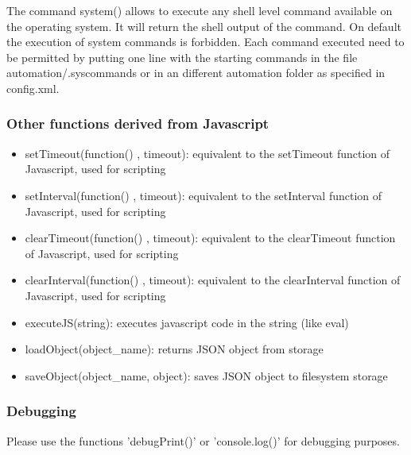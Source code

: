 The command system() allows to execute any shell level command available on the operating 
system. It will return the shell output of the command.  On default the execution of 
system commands is forbidden. Each command executed need to be permitted by putting one 
line with the starting commands in the file automation/.syscommands or in an different 
automation folder as specified in config.xml.

\subsubsection{Other functions derived from Javascript}
\begin{itemize}
\item setTimeout(function() { }, timeout): equivalent to the setTimeout function of Javascript, used for scripting
\item setInterval(function() { }, timeout): equivalent to the setInterval function of Javascript, used for scripting
\item clearTimeout(function() { }, timeout): equivalent to the clearTimeout function of Javascript, used for scripting
\item clearInterval(function() { }, timeout): equivalent to the clearInterval function of Javascript, used for scripting
\item executeJS(string): executes javascript code in the string (like eval)
\item loadObject(object\_name): returns JSON object from storage
\item saveObject(object\_name, object):  saves JSON object to filesystem storage
\end{itemize}


\subsubsection{Debugging}

Please use the functions 'debugPrint()' or 'console.log()' for debugging purposes.


